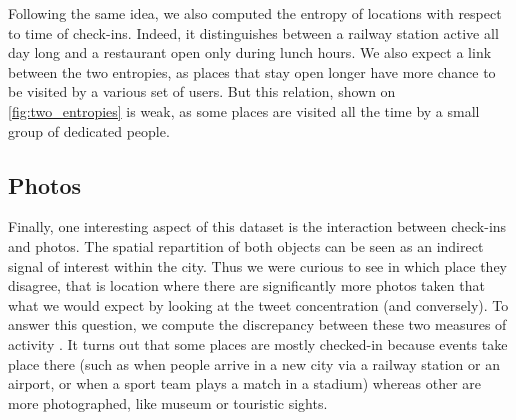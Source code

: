 Following the same idea, we also computed the entropy of locations with respect
to time of check-ins. Indeed, it distinguishes between a railway station active
all day long and a restaurant open only during lunch hours.  We also expect a
link between the two entropies, as places that stay open longer have more
chance to be visited by a various set of users. But this relation, shown on
\autoref{fig:two_entropies} is weak, as some places are visited all the time by
a small group of dedicated people.



\subsection{Photos}

Finally, one interesting aspect of this dataset is the interaction between
check-ins and photos.  The spatial repartition of both objects can be seen as
an indirect signal of interest within the city. Thus we were curious to see in
which place they disagree, that is location where there are significantly more
photos taken that what we would expect by looking at the tweet concentration
(and conversely). To answer this question, we compute the discrepancy between
these two measures of activity \autocite{Agarwal2006spatial}. It turns out that
some places are mostly checked-in because events take place there (such as when
people arrive in a new city via a railway station or an airport, or when a
sport team plays a match in a stadium) whereas other are more photographed,
like museum or touristic sights.


\clearpage
